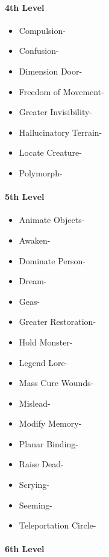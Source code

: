\documentclass[
]{article}
\providecommand{\tightlist}{%
  \setlength{\itemsep}{0pt}\setlength{\parskip}{0pt}}
\begin{document}
\hypertarget{4th-level}{%
\paragraph{4th Level}\label{4th-level}}

\begin{itemize}
\tightlist
\item
  Compulsion-
\item
  Confusion-
\item
  Dimension Door-
\item
  Freedom of Movement-
\item
  Greater Invisibility-
\item
  Hallucinatory Terrain-
\item
  Locate Creature-
\item
  Polymorph-
\end{itemize}

\hypertarget{5th-level}{%
\paragraph{5th Level}\label{5th-level}}

\begin{itemize}
\tightlist
\item
  Animate Objects-
\item
  Awaken-
\item
  Dominate Person-
\item
  Dream-
\item
  Geas-
\item
  Greater Restoration-
\item
  Hold Monster-
\item
  Legend Lore-
\item
  Mass Cure Wounds-
\item
  Mislead-
\item
  Modify Memory-
\item
  Planar Binding-
\item
  Raise Dead-
\item
  Scrying-
\item
  Seeming-
\item
  Teleportation Circle-
\end{itemize}

\hypertarget{6th-level}{%
\paragraph{6th Level}\label{6th-level}}
\end{document}
